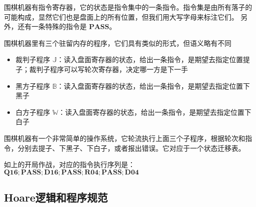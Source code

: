 \documentclass[a4paper,10.5pt]{article}
\begin{document}
围棋机器有指令寄存器，它的状态是指令集中的一条指令。指令集是由所有落子的可能构成，显然它们也是盘面上的所有位置，但我们用大写字母来标注它们。
另外，还有一条特殊的指令是 $\mathbf{PASS}$。

\setcounter{gomove}{-1}
\begin{center}
    \begin{psgoboard}
    \end{psgoboard}
\end{center}

围棋机器里有三个驻留内存的程序，它们具有类似的形式，但语义略有不同

\begin{itemize}
    \item 裁判子程序 $\mathbb{J}$：读入盘面寄存器的状态，给出一条指令，是期望去指定位置提子；裁判子程序可以写轮次寄存器，决定哪一方是下一手
    \item 黑方子程序 $\mathbb{B}$：读入盘面寄存器的状态，给出一条指令，是期望去指定位置下黑子
    \item 白方子程序 $\mathbb{W}$：读入盘面寄存器的状态，给出一条指令，是期望去指定位置下白子
\end{itemize}

围棋机器有一个非常简单的操作系统，它轮流执行上面三个子程序，根据轮次和指令，分别去提子、下黑子、下白子，或者报出错误。它对应于一个状态迁移表。

如上的开局作战，对应的指令执行序列是：$\mathbf{Q16; PASS; D16; PASS; R04; PASS; D04}$


\subsection{Hoare逻辑和程序规范}
\end{document}
